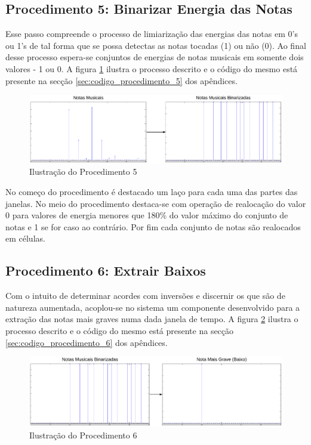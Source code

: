 \subsection{Procedimento 5: Binarizar Energia das Notas}
\label{subsec:procedimento_5}

Esse passo compreende o processo de limiarização das energias das notas em 0's ou 1's de tal forma que se possa detectas as notas tocadas (1) ou não (0). Ao final desse processo espera-se conjuntos de energias de notas musicais em somente dois valores - 1 ou 0. A figura \ref{fig:procedimento_5} ilustra o processo descrito e o código do mesmo está presente na secção \ref{sec:codigo_procedimento_5} dos apêndices.

\begin{figure}[h] 
  \centering
    \includegraphics[keepaspectratio=true, scale=0.55]{figuras/procedimento_5}
    \caption{Ilustração do Procedimento 5}
    \label{fig:procedimento_5}
\end{figure}

No começo do procedimento é destacado um laço para cada uma das partes das janelas. No meio do procedimento destaca-se com operação de realocação do valor 0 para valores de energia menores que 180\% do valor máximo do conjunto de notas e 1 se for caso ao contrário. Por fim cada conjunto de notas são realocados em células.

\subsection{Procedimento 6: Extrair Baixos}
\label{subsec:procedimento_6}

Com o intuito de determinar acordes com inversões e discernir os que são de natureza aumentada, acoplou-se no sistema um componente desenvolvido para a extração das notas mais graves numa dada janela de tempo. A figura \ref{fig:procedimento_6} ilustra o processo descrito e o código do mesmo está presente na secção \ref{sec:codigo_procedimento_6} dos apêndices.

\begin{figure}[h] 
  \centering
    \includegraphics[keepaspectratio=true, scale=0.55]{figuras/procedimento_6}
    \caption{Ilustração do Procedimento 6}
    \label{fig:procedimento_6}
\end{figure}

